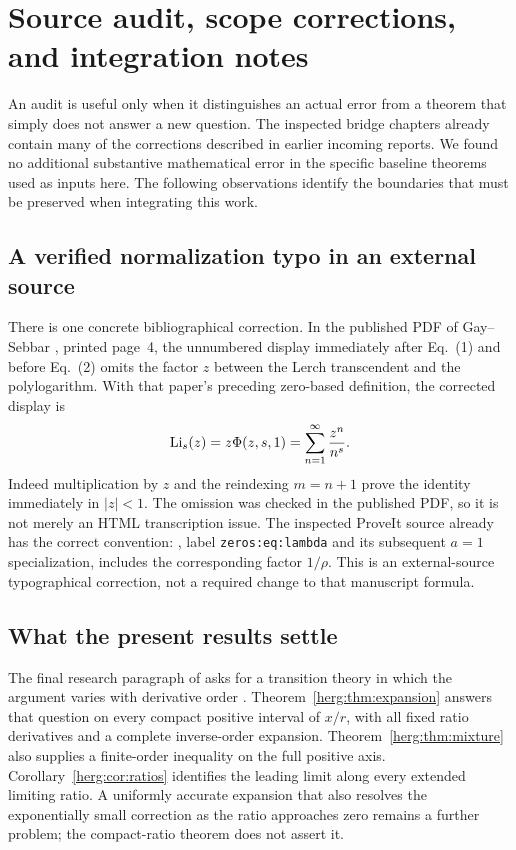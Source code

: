 \section{Source audit, scope corrections, and integration notes}
\label{sec:audit}

An audit is useful only when it distinguishes an actual error from a theorem
that simply does not answer a new question. The inspected bridge chapters
already contain many of the corrections described in earlier incoming
reports. We found no additional substantive mathematical error in the
specific baseline theorems used as inputs here. The following observations
identify the boundaries that must be preserved when integrating this work.

\subsection{A verified normalization typo in an external source}
There is one concrete bibliographical correction. In the published PDF of
Gay--Sebbar \cite{gamma:GaySebbar2024}, printed page~4, the unnumbered
display immediately after Eq.~(1) and before Eq.~(2) omits the factor $z$
between the Lerch transcendent and the polylogarithm. With that paper's
preceding zero-based definition, the corrected display is
\begin{equation}\label{audit:lerch-typo}
 \operatorname{Li}_s(z)=z\Phi(z,s,1)
      =\sum_{n=1}^{\infty}\frac{z^n}{n^s}.
\end{equation}
Indeed multiplication by $z$ and the reindexing $m=n+1$ prove the identity
immediately in $|z|<1$. The omission was checked in the published PDF, so
it is not merely an HTML transcription issue. The inspected ProveIt source
already has the correct convention: ,
label \texttt{zeros:eq:lambda} and its subsequent $a=1$ specialization,
includes the corresponding factor $1/\rho$. This is an external-source
typographical correction, not a required change to that manuscript formula.

\subsection{What the present results settle}
The final research paragraph of
 asks for a transition theory in which
the argument varies with derivative order \cite{repoHerglotz}.
Theorem~\ref{herg:thm:expansion} answers that question on every compact
positive interval of $x/r$, with all fixed ratio derivatives and a complete
inverse-order expansion. Theorem~\ref{herg:thm:mixture} also supplies a
finite-order inequality on the full positive axis.
Corollary~\ref{herg:cor:ratios} identifies the leading limit along every
extended limiting ratio. A uniformly accurate expansion that also resolves
the exponentially small correction as the ratio approaches zero remains
a further problem; the compact-ratio theorem does not assert it.

